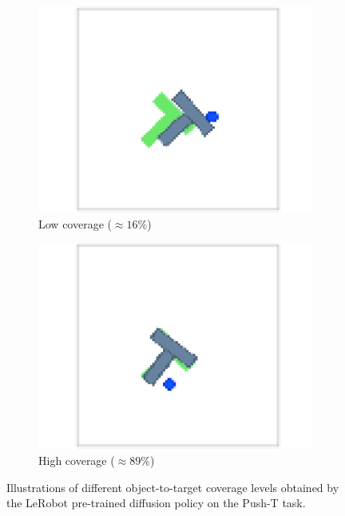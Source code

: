 \begin{figure}[!htb]
    \begin{subfigure}[b]{0.4\linewidth}
        \centering
        \includegraphics[width=\linewidth]{figures/illustration_50.pdf}
        \caption{Low coverage ($\approx 16\%$)}
    \end{subfigure}
    \begin{subfigure}[b]{0.4\linewidth}
        \centering
        \includegraphics[width=\linewidth]{figures/illustration_150.pdf}
        \caption{High coverage ($\approx 89\%$)}
    \end{subfigure}
    \caption{Illustrations of different object-to-target coverage levels obtained by the LeRobot pre-trained diffusion policy on the Push-T task.}
    \label{fig:coverage_illustration}
\end{figure}
